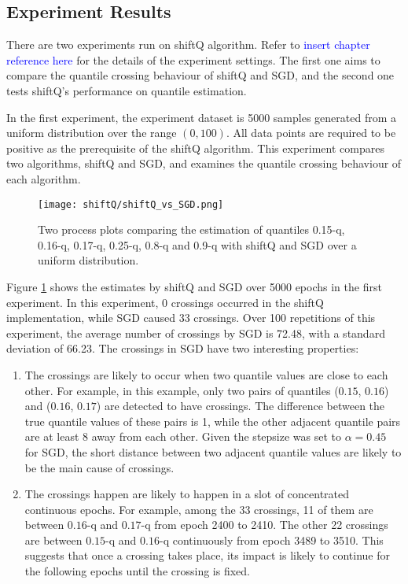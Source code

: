\subsection{Experiment Results}

There are two experiments run on shiftQ algorithm. Refer to \textcolor{blue}{insert chapter reference here} for the details of the experiment settings. The first one aims to compare the quantile crossing behaviour of shiftQ and SGD, and the second one tests shiftQ's performance on quantile estimation.

In the first experiment, the experiment dataset is 5000 samples generated from a uniform distribution over the range $(0,100)$. All data points are required to be positive as the prerequisite of the shiftQ algorithm. This experiment compares two algorithms, shiftQ and SGD, and examines the quantile crossing behaviour of each algorithm.

\begin{figure}[h!]
	\texttt{[image: shiftQ/shiftQ\_vs\_SGD.png]}
    \caption{Two process plots comparing the estimation of quantiles 0.15-q, 0.16-q, 0.17-q, 0.25-q, 0.8-q and 0.9-q with shiftQ and SGD over a uniform distribution.}
    \label{fig: shiftQ_SGD}
\end{figure}

Figure \ref{fig: shiftQ_SGD} shows the estimates by shiftQ and SGD over 5000 epochs in the first experiment. In this experiment, $0$ crossings occurred in the shiftQ implementation, while SGD caused 33 crossings. Over 100 repetitions of this experiment, the average number of crossings by SGD is 72.48, with a standard deviation of 66.23. The crossings in SGD have two interesting properties:
    \begin{enumerate}
        \item The crossings are likely to occur when two quantile values are close to each other. For example, in this example, only two pairs of quantiles ($0.15$, $0.16$) and ($0.16$, $0.17$) are detected to have crossings. The difference between the true quantile values of these pairs is 1, while the other adjacent quantile pairs are at least 8 away from each other. Given the stepsize was set to $\alpha = 0.45$ for SGD, the short distance between two adjacent quantile values are likely to be the main cause of crossings.
        \item The crossings happen are likely to happen in a slot of concentrated continuous epochs. For example, among the 33 crossings, 11 of them are between $0.16$-q and $0.17$-q from epoch 2400 to 2410. The other 22 crossings are between $0.15$-q and $0.16$-q continuously from epoch 3489 to 3510. This suggests that once a crossing takes place, its impact is likely to continue for the following epochs until the crossing is fixed.
    \end{enumerate}

